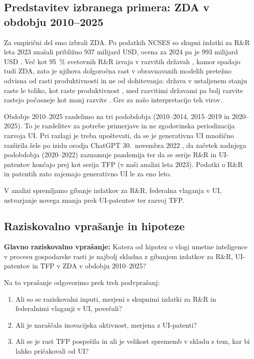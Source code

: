 \documentclass[12pt,a4paper]{article}
\begin{document}
\subsection{Predstavitev izbranega primera: ZDA v obdobju 2010--2025}
Za empirični del smo izbrali ZDA. Po podatkih NCSES so skupni izdatki za R\&R leta 2023 znašali približno 937 milijard USD, ocena za 2024 pa je 993 milijard USD \parencite{ncses2026}. Več kot 95~\% svetovnih R\&R izvaja v razvitih državah \parencite[str.~31--32]{polanec_rast}, kamor spadajo tudi ZDA, zato je njihova dolgoročna rast v obravnavanih modelih pretežno odvisna od rasti produktivnosti in ne od dohitevanja: država v ustaljenem stanju raste le toliko, kot raste produktivnost \parencite[str.~130,~135]{garin2021}, med razvitimi državami pa bolj razvite rastejo počasneje kot manj razvite \parencite[str.~5--6]{polanec_rast}. Gre za našo interpretacijo teh virov.

Obdobje 2010--2025 razdelimo na tri podobdobja (2010--2014, 2015--2019 in 2020--2025). To je razdelitev za potrebe primerjave in ne zgodovinska periodizacija razvoja UI. Pri razlagi je treba upoštevati, da se je generativna UI množično razširila šele po izidu orodja ChatGPT 30.~novembra 2022 \parencite{openai2022}, da začetek zadnjega podobdobja (2020--2022) zaznamuje pandemija ter da se serije R\&R in UI-patentov končajo prej kot serija TFP (v naši analizi leta 2023). Podatki o R\&R in patentih zato zajemajo generativno UI le za eno leto.

V analizi spremljamo gibanje izdatkov za R\&R, federalna vlaganja v UI, ustvarjanje novega znanja prek UI-patentov ter razvoj TFP.

\subsection{Raziskovalno vprašanje in hipoteze}
\noindent\textbf{Glavno raziskovalno vprašanje:} Katera od hipotez o vlogi umetne inteligence v procesu gospodarske rasti je najbolj skladna z gibanjem izdatkov za R\&R, UI-patentov in TFP v ZDA v obdobju 2010--2025?

Na to vprašanje odgovorimo prek treh podvprašanj:
\begin{enumerate}
    \item Ali so se raziskovalni inputi, merjeni s skupnimi izdatki za R\&R in federalnimi vlaganji v UI, povečali?
    \item Ali je naraščala inovacijska aktivnost, merjena z UI-patenti?
    \item Ali se je rast TFP pospešila in ali je velikost sprememb v skladu s tem, kar bi lahko pričakovali od UI?
\end{enumerate}
\end{document}
